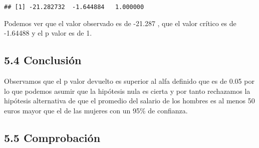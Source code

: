 \documentclass[
  a4paper]{article}
\newenvironment{Shaded}{\begin{snugshade}}{\end{snugshade}}
\newcommand{\AttributeTok}[1]{\textcolor[rgb]{0.77,0.63,0.00}{#1}}
\newcommand{\ConstantTok}[1]{\textcolor[rgb]{0.00,0.00,0.00}{#1}}
\newcommand{\DecValTok}[1]{\textcolor[rgb]{0.00,0.00,0.81}{#1}}
\newcommand{\FunctionTok}[1]{\textcolor[rgb]{0.00,0.00,0.00}{#1}}
\newcommand{\NormalTok}[1]{#1}
\newcommand{\OtherTok}[1]{\textcolor[rgb]{0.56,0.35,0.01}{#1}}
\newcommand{\SpecialCharTok}[1]{\textcolor[rgb]{0.00,0.00,0.00}{#1}}
\newcommand{\StringTok}[1]{\textcolor[rgb]{0.31,0.60,0.02}{#1}}
\begin{document}
\begin{Shaded}
\end{Shaded}

\begin{verbatim}
## [1] -21.282732  -1.644884   1.000000
\end{verbatim}

Podemos ver que el valor observado es de -21.287 , que el valor crítico
es de -1.64488 y el p valor es de 1.

\hypertarget{conclusiuxf3n-2}{%
\subsection{5.4 Conclusión}\label{conclusiuxf3n-2}}

Observamos que el p valor devuelto es superior al alfa definido que es
de 0.05 por lo que podemos asumir que la hipótesis nula es cierta y por
tanto rechazamos la hipótesis alternativa de que el promedio del salario
de los hombres es al menos 50 euros mayor que el de las mujeres con un
95\% de confianza.

\hypertarget{comprobaciuxf3n-2}{%
\subsection{5.5 Comprobación}\label{comprobaciuxf3n-2}}
\end{document}
